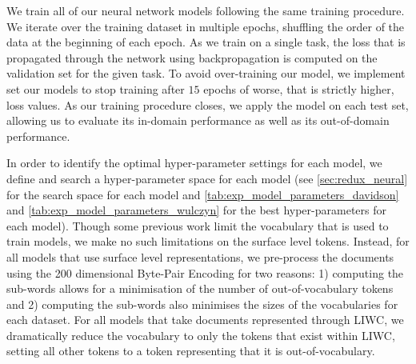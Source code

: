 We train all of our neural network models following the same training procedure. We iterate over the training dataset in multiple epochs, shuffling the order of the data at the beginning of each epoch. As we train on a single task, the loss that is propagated through the network using backpropagation is computed on the validation set for the given task. To avoid over-training our model, we implement set our models to stop training after $15$ epochs of worse, that is strictly higher, loss values. As our training procedure closes, we apply the model on each test set, allowing us to evaluate its in-domain performance as well as its out-of-domain performance.

In order to identify the optimal hyper-parameter settings for each model, we define and search a hyper-parameter space for each model (see \autoref{sec:redux_neural} for the search space for each model and \autoref{tab:exp_model_parameters_davidson} and \autoref{tab:exp_model_parameters_wulczyn} for the best hyper-parameters for each model). Though some previous work \cite{Waseem:2018, CITE: Other papers that restrict vocabulary sizes} limit the vocabulary that is used to train models, we make no such limitations on the surface level tokens. Instead, for all models that use surface level representations, we pre-process the documents using the 200 dimensional Byte-Pair Encoding \cite{Heinzerling:2018} for two reasons: 1) computing the sub-words allows for a minimisation of the number of out-of-vocabulary tokens and 2) computing the sub-words also minimises the sizes of the vocabularies for each dataset. For all models that take documents represented through LIWC, we dramatically reduce the vocabulary to only the tokens that exist within LIWC, setting all other tokens to a token representing that it is out-of-vocabulary.

